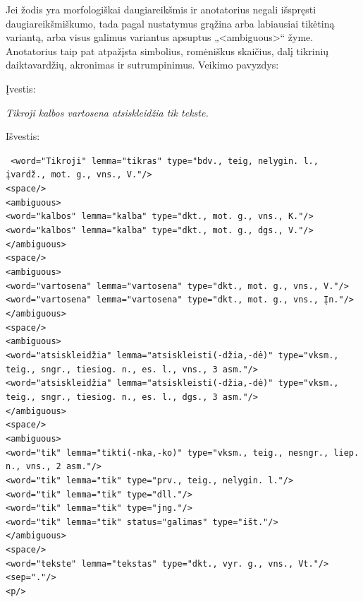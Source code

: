 \documentclass{VUMIFInfBakalaurinis}
\begin{document}
Jei žodis yra morfologiškai daugiareikšmis ir anotatorius negali
išspręsti daugiareikšmiškumo, tada pagal nustatymus grąžina arba
labiausiai tikėtiną variantą, arba visus galimus variantus apsuptus
„\textless ambiguous\textgreater“ žyme. Anotatorius taip pat atpažįsta
simbolius, romėniškus skaičius, dalį tikrinių daiktavardžių, akronimas
ir sutrumpinimus. Veikimo pavyzdys:

\noindent Įvestis:

\noindent \textit{Tikroji kalbos vartosena atsiskleidžia tik tekste.}

\noindent Išvestis:

\scriptsize
\noindent \texttt{
<word="Tikroji" lemma="tikras" type="bdv., teig, nelygin. l., įvardž., mot. g., vns., V."/>\\
<space/>\\
<ambiguous>\\
<word="kalbos" lemma="kalba" type="dkt., mot. g., vns., K."/>\\
<word="kalbos" lemma="kalba" type="dkt., mot. g., dgs., V."/>\\
</ambiguous>\\
<space/>\\
<ambiguous>\\
<word="vartosena" lemma="vartosena" type="dkt., mot. g., vns., V."/>\\
<word="vartosena" lemma="vartosena" type="dkt., mot. g., vns., Įn."/>\\
</ambiguous>\\
<space/>\\
<ambiguous>\\
<word="atsiskleidžia" lemma="atsiskleisti(-džia,-dė)" type="vksm., teig., sngr., tiesiog. n., es. l., vns., 3 asm."/>\\
<word="atsiskleidžia" lemma="atsiskleisti(-džia,-dė)" type="vksm., teig., sngr., tiesiog. n., es. l., dgs., 3 asm."/>\\
</ambiguous>\\
<space/>\\
<ambiguous>\\
<word="tik" lemma="tikti(-nka,-ko)" type="vksm., teig., nesngr., liep. n., vns., 2 asm."/>\\
<word="tik" lemma="tik" type="prv., teig., nelygin. l."/>\\
<word="tik" lemma="tik" type="dll."/>\\
<word="tik" lemma="tik" type="jng."/>\\
<word="tik" lemma="tik" status="galimas" type="išt."/>\\
</ambiguous>\\
<space/>\\
<word="tekste" lemma="tekstas" type="dkt., vyr. g., vns., Vt."/>\\
<sep="."/>\\
<p/>
}
\normalsize
\end{document}
